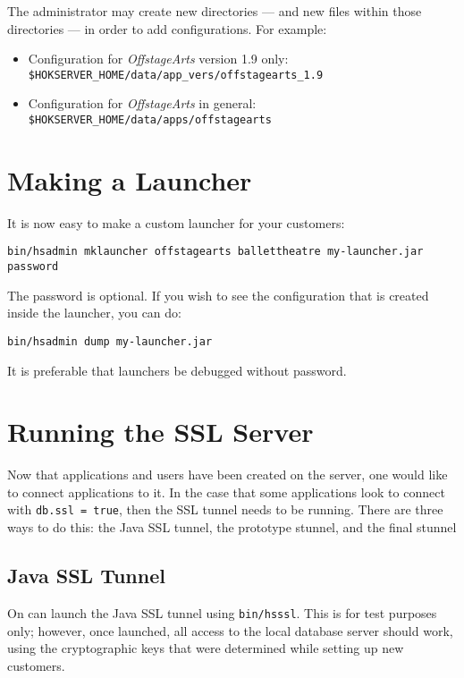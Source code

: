 \documentclass[11pt]{article}
\begin{document}
\begin{enumerate}
The administrator may create new directories --- and new files within
those directories --- in order to add configurations.  For example:
 \begin{itemize}
 \item Configuration for \emph{OffstageArts} version 1.9 only: {\tt \$HOKSERVER\_HOME/data/app\_vers/offstagearts\_1.9}
 \item Configuration for \emph{OffstageArts} in general: {\tt \$HOKSERVER\_HOME/data/apps/offstagearts}
 \end{itemize}

\section{Making a Launcher}

It is now easy to make a custom launcher for your customers:
\begin{verbatim}
bin/hsadmin mklauncher offstagearts ballettheatre my-launcher.jar password
\end{verbatim}

The password is optional.  If you wish to see the configuration that is created inside the launcher, you can do:
\begin{verbatim}
bin/hsadmin dump my-launcher.jar
\end{verbatim}

It is preferable that launchers be debugged without password.

\section{Running the SSL Server}

Now that applications and users have been created on the server, one
would like to connect applications to it.  In the case that some
applications look to connect with {\tt db.ssl = true}, then the SSL
tunnel needs to be running.  There are three ways to do this: the Java SSL tunnel, the prototype stunnel, and the final stunnel

\subsection{Java SSL Tunnel}

On can launch the Java SSL tunnel using {\tt bin/hsssl}.  This is for test purposes only; however, once launched, all access to the local database server should work, using the cryptographic keys that were determined while setting up new customers.


\end{enumerate}
\end{document}
